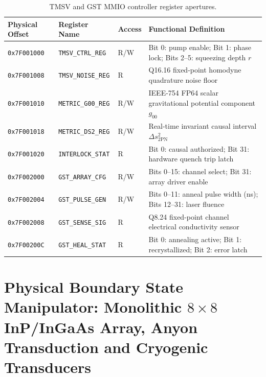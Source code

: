 \documentclass[11pt,onecolumn]{article}
\begin{document}
\begin{table}[!htbp]
\centering\small
\caption{TMSV and GST MMIO controller register apertures.}
\label{tab:tmsv_regs}
\begin{tabularx}{\textwidth}{@{}l l l X@{}}
\toprule
Physical Offset & Register Name & Access & Functional Definition \\
\midrule
\texttt{0x7F001000} & \texttt{TMSV\_CTRL\_REG} & R/W & Bit 0: pump enable; Bit 1: phase lock; Bits 2--5: squeezing depth $r$ \\
\texttt{0x7F001008} & \texttt{TMSV\_NOISE\_REG} & R & Q16.16 fixed-point homodyne quadrature noise floor \\
\texttt{0x7F001010} & \texttt{METRIC\_G00\_REG} & R/W & IEEE-754 FP64 scalar gravitational potential component $g_{00}$ \\
\texttt{0x7F001018} & \texttt{METRIC\_DS2\_REG} & R/W & Real-time invariant causal interval $\Delta s^2_{\text{2PN}}$ \\
\texttt{0x7F001020} & \texttt{INTERLOCK\_STAT} & R & Bit 0: causal authorized; Bit 31: hardware quench trip latch \\
\texttt{0x7F002000} & \texttt{GST\_ARRAY\_CFG} & R/W & Bits 0--15: channel select; Bit 31: array driver enable \\
\texttt{0x7F002004} & \texttt{GST\_PULSE\_GEN} & R/W & Bits 0--11: anneal pulse width (ns); Bits 12--31: laser fluence \\
\texttt{0x7F002008} & \texttt{GST\_SENSE\_SIG} & R & Q8.24 fixed-point channel electrical conductivity sensor \\
\texttt{0x7F00200C} & \texttt{GST\_HEAL\_STAT} & R & Bit 0: annealing active; Bit 1: recrystallized; Bit 2: error latch \\
\bottomrule
\end{tabularx}
\end{table}

\FloatBarrier
\section[Physical Boundary State Manipulator: InP/InGaAs Array, Anyon Transduction \& Cryogenics]{Physical Boundary State Manipulator: Monolithic $8\times 8$ InP/InGaAs Array, Anyon Transduction and Cryogenic Transducers}
\label{sec:cryo}

\FloatBarrier
\end{document}
